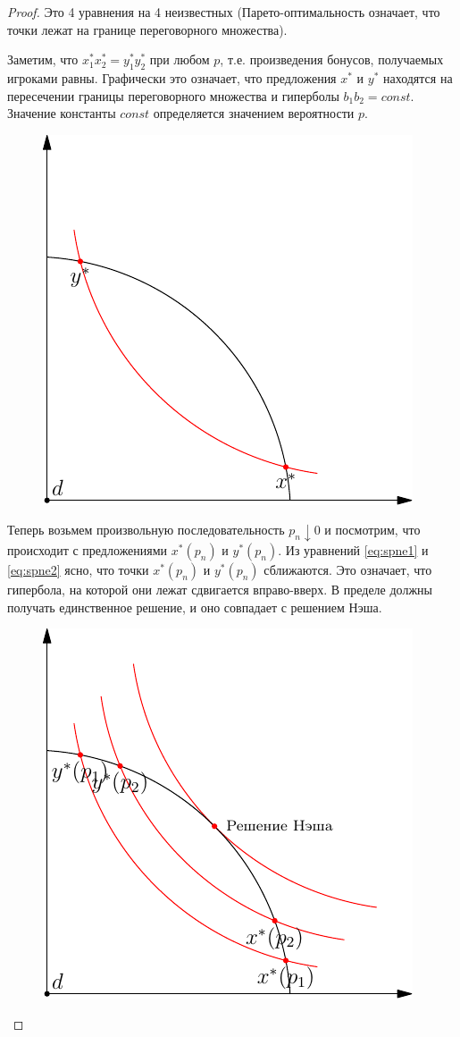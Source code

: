 \begin{proof}
Это 4 уравнения на 4 неизвестных (Парето-оптимальность означает, что
точки лежат на границе переговорного множества). 

Заметим, что $x_{1}^{*}x_{2}^{*}=y_{1}^{*}y_{2}^{*}$ при любом $p$,
т.е. произведения бонусов, получаемых игроками равны. Графически это
означает, что предложения $x^{*}$ и $y^{*}$ находятся на пересечении
границы переговорного множества и гиперболы $b_{1}b_{2}=const$.
Значение константы $const$ определяется
значением вероятности $p$.


\begin{figure}[htbp]
   \includegraphics{coop_noncop0.pdf}
\end{figure}


Теперь возьмем произвольную последовательность $p_{n}\downarrow 0$ и посмотрим, что происходит с предложениями $x^{*}(p_{n})$ и $y^{*}(p_{n})$. Из уравнений \ref{eq:spne1} и \ref{eq:spne2} ясно, что точки $x^{*}(p_{n})$ и $y^{*}(p_{n})$ сближаются. Это означает, что гипербола, на которой они лежат сдвигается вправо-вверх. В пределе должны получать единственное решение, и оно совпадает с решением Нэша.

\begin{figure}[htbp]
   \includegraphics{coop_noncop.pdf}
\end{figure}


\end{proof}

